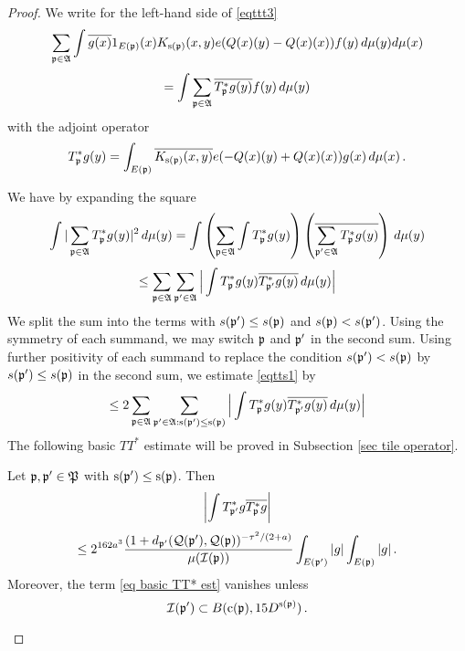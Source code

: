 \begin{proof}

    We write for the left-hand side of \eqref{eqttt3}
\begin{equation}
    \sum_{\mathfrak p \in \mathfrak{A}}\int \overline{g(x)} 1_{E(\mathfrak p)}(x)
    {K_{\mathrm{s}(\mathfrak p)}(x,y)}e({Q}(x)(y) -
    {Q}(x)(x))
    f(y)\, d\mu (y)d\mu(x)
\end{equation}
\begin{equation}
    =\int \sum_{\mathfrak p \in \mathfrak{A}} \overline{T_{\mathfrak p} ^*g(y)}   f(y)\, d\mu(y)
\end{equation}
with the adjoint operator
\begin{equation}\label{eq tstarwritten}
    T_{\mathfrak p}^*g(y)=\int_{E(\mathfrak p)} \overline{K_{\mathrm{s}(\mathfrak p)}(x,y)}e(-{Q}(x)(y)+
    {Q}(x)(x))g(x)\, d\mu(x)\, .
\end{equation}





    We have by expanding the square
        \begin{equation}
    \int |\sum_{\mathfrak p\in \mathfrak{A}}T^*_{\mathfrak p}g(y)|^2\, d\mu(y)=
    \int \left(\sum_{\mathfrak p\in \mathfrak{A}}\int T^*_{\mathfrak p}g(y)\right)
    \left(\overline{\sum_{\mathfrak p'\in \mathfrak{A}}T^*_{\mathfrak p}g(y)}\right)\, d\mu(y)
    \end{equation}\label{eqtts1}
    \begin{equation}
    \le \sum_{\mathfrak p\in \mathfrak{A}} \sum_{\mathfrak p'\in \mathfrak{A}}
    \Big|\int T^*_{\mathfrak p}g(y)\overline{T^*_{\mathfrak p'}g(y)}\, d\mu(y)\Big|
            \end{equation}
We split the sum into the terms with $s(\mathfrak p')\le s(\mathfrak p)$
and $s(\mathfrak p)< s(\mathfrak p')$. Using the symmetry of each summand,
we may switch $\mathfrak p$ and $\mathfrak p'$ in the second sum. Using further positivity
of each summand to replace the condition $s(\mathfrak p')< s(\mathfrak p)$
by $s(\mathfrak p')\le  s(\mathfrak p)$ in the second sum, we estimate \eqref{eqtts1} by
\begin{equation}\label{eqtts2}
    \le2 \sum_{\mathfrak p\in \mathfrak{A}} \sum_{\mathfrak p'\in \mathfrak{A}: \mathrm{s}(\mathfrak p')\le \mathrm{s}(\mathfrak p)}
    \Big|\int T^*_{\mathfrak p}g(y)\overline{T^*_{\mathfrak p'}g(y)}\, d\mu(y)\Big|
            \end{equation}
The following basic $TT^*$ estimate will be proved in Subsection \ref{sec tile operator}.
\begin{lemma}
\label{lem basic TT*}
Let $\mathfrak p, \mathfrak p'\in \mathfrak P$ with
$\mathrm{s}({\mathfrak p'})\leq \mathrm{s}({\mathfrak p})$.
Then
\begin{equation}
    \label{eq basic TT* est}
    \left|\int T^*_{\mathfrak p'}g\overline{T^*_{\mathfrak p}g}\right|
    \end{equation}
\begin{equation}
    \le 2^{162a^3}\frac{(1+d_{\mathfrak p'}(\mathcal{Q}(\mathfrak p'), \mathcal{Q}(\mathfrak p))^{-\tau^2/(2+a)}}{\mu(\mathcal{I}(\mathfrak p))}\int_{E(\mathfrak p')}|g|\int_{E(\mathfrak p)}|g|\,.
\end{equation}
Moreover, the term   \eqref{eq basic TT* est} vanishes unless
\begin{equation}
    \mathcal{I}(\mathfrak p') \subset B(\mathrm{c}(\mathfrak p), 15D^{\mathrm{s}(\mathfrak p)})\, .
\end{equation}
\end{lemma}






\end{proof}

